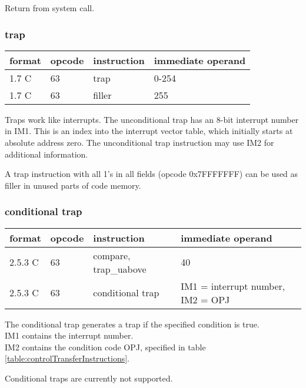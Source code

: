 \documentclass[forwardcom.tex]{subfiles}
\begin{document}
Return from system call.

\subsubsection{trap}
\label{traps}
\label{table:trapInstruction}
\begin{tabular}{|p{12mm}|p{12mm}|p{30mm}|p{80mm}|}
\hline
\bfseries format & \bfseries opcode & \bfseries instruction & \bfseries immediate operand \\ \hline
1.7 C & 63 & trap & 0-254 \\ \hline
1.7 C & 63 & filler & 255 \\ \hline
\end{tabular}
\vspace{2mm}

Traps work like interrupts. The unconditional trap has an 8-bit interrupt number in IM1. This is an index into the interrupt vector table, which initially starts at absolute address zero. The unconditional trap instruction may use IM2 for additional information.  
\vspace{2mm}

A trap instruction with all 1's in all fields (opcode 0x7FFFFFFF) can be used as filler in unused parts of code memory.

\subsubsection{conditional trap}
\label{table:conditionalTrapInstructions}
\begin{tabular}{|p{12mm}|p{12mm}|p{30mm}|p{80mm}|}
\hline
\bfseries format & \bfseries opcode & \bfseries instruction & \bfseries immediate operand \\ \hline
2.5.3 C & 63 & compare, trap\_uabove & 40 \\ \hline
2.5.3 C & 63 & conditional trap & IM1 = interrupt number, IM2 = OPJ \\ \hline
\end{tabular}
\vspace{2mm}

The conditional trap generates a trap if the specified condition is true.\\
IM1 contains the interrupt number. \\
IM2 contains the condition code OPJ, specified in table  \ref{table:controlTransferInstructions}.
\vspace{2mm}

Conditional traps are currently not supported.
\vspace{2mm}
\end{document}
